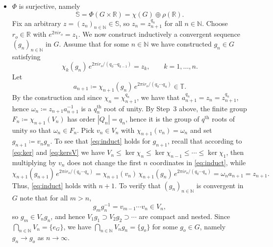 \documentclass{amsart}
\numberwithin{equation}{subsection}
\theoremstyle{remark}
\begin{document}
\begin{itemize}
    \item \(\Phi\) is surjective, namely \begin{equation}\label{eq:So}
    \mathbb{S}=\Phi\left(G\times\mathbb{R}\right)=\chi\left(G\right)\oplus\rho\left(\mathbb{R}\right).
    \end{equation}
    Fix an arbitrary \(z=\left(z_{n}\right)_{n\in\mathbb{N}}\in\mathbb{S}\), so \(z_{n}=z_{n+1}^{q_{n}}\) for all \(n\in\mathbb{N}\). Choose \(r_{o}\in\mathbb{R}\) with \(e^{2\pi i r_{o}}=z_{1}\). We now construct inductively a convergent sequence \(\left(g_{n}\right)_{n\in\mathbb{N}}\) in \(G\). Assume that for some \(n\in\mathbb{N}\) we have constructed \(g_{n}\in G\) satisfying
    \begin{equation}\label{eq:induct}
    \chi_{k}\left(g_{n}\right)\,e^{2\pi i r_{o}/\left(q_0\cdots q_{k-1}\right)}=z_{k},\qquad k=1,\dots,n.
    \end{equation}
    Let
    \[a_{n+1}\coloneqq \chi_{n+1}(g_{n})\,e^{2\pi i r_{o}/\left(q_{0}\cdots q_{n}\right)}\in\mathbb{T}.\]
    By the construction and since \(\chi_{n}=\chi_{n+1}^{q_{n}}\), we have that \(a_{n+1}^{q_{n}}=z_{n}=z_{n+1}^{q_{n}}\), hence \(\omega_{n}\coloneqq z_{n+1}a_{n+1}^{-1}\) is a \(q_{n}^{\mathrm{th}}\) root of unity. By Step~3 above, the finite group \(F_{n}\coloneqq \chi_{n+1}\left(V_{n}\right)\) has order \(\left|Q_{n}\right|=q_{n}\), hence it is the group of \(q^{\mathrm{th}}\) roots of unity so that \(\omega_{n}\in F_n\). Pick \(v_{n}\in V_{n}\) with \(\chi_{n+1}\left(v_{n}\right)=\omega_{n}\) and set \(g_{n+1}\coloneqq v_{n}g_{n}\). To see that \eqref{eq:induct} holds for \(g_{n+1}\), recall that according to \eqref{eq:ker} and \eqref{eq:kersV} we have \(V_{n}\leq\ker\chi_{n}\leq\ker\chi_{n-1}\leq\cdots\leq\ker\chi_1\), then multiplying by \(v_{n}\) does not change the first \(n\) coordinates in \eqref{eq:induct}, while
    \[\chi_{n+1}(g_{n+1})\,e^{2\pi i r_{o}/(q_{0}\cdots q_{n})}=\chi_{n+1}\left(v_{n}\right)\,\chi_{n+1}\left(g_{n}\right)\,e^{2\pi i r_{o}/(q_{0}\cdots q_{n})}=\omega_{n}a_{n+1}=z_{n+1}.\]
    Thus, \eqref{eq:induct} holds with \(n+1\). To verify that \(\left(g_{n}\right)_{n\in\mathbb{N}}\) is convergent in \(G\) note that for all \(m>n\),
    \[g_{m}g_{n}^{-1}=v_{m-1}\cdots v_{n}\in V_{n},\]
    so \(g_{m}\in V_{n}g_{n}\), and hence \(V_{1}g_{1}\supset V_{2}g_{2}\supset\dotsm\) are compact and nested. Since \(\bigcap_{n\in\mathbb{N}}V_{n}=\{e_G\}\), we have \(\bigcap_{n\in\mathbb{N}}V_{n}g_{n}=\{g_{o}\}\) for some \(g_{o}\in G\), namely \(g_{n}\to g_{o}\) as \(n\to\infty\).\\

\end{itemize}
\end{document}
